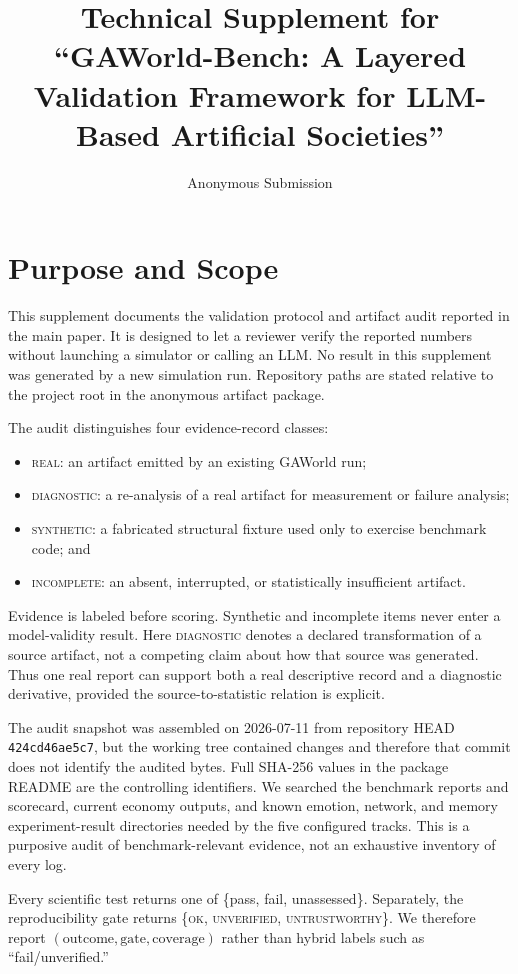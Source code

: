 \documentclass[letterpaper]{article}
\title{Technical Supplement for ``GAWorld-Bench: A Layered Validation Framework for LLM-Based Artificial Societies''}
\author{Anonymous Submission}
\begin{document}
\maketitle

\section{Purpose and Scope}

This supplement documents the validation protocol and artifact audit reported in the main paper. It is
designed to let a reviewer verify the reported numbers without launching a simulator or calling an LLM.
No result in this supplement was generated by a new simulation run. Repository paths are stated relative
to the project root in the anonymous artifact package.

The audit distinguishes four evidence-record classes:
\begin{itemize}
    \item \textsc{real}: an artifact emitted by an existing GAWorld run;
    \item \textsc{diagnostic}: a re-analysis of a real artifact for measurement or failure analysis;
    \item \textsc{synthetic}: a fabricated structural fixture used only to exercise benchmark code; and
    \item \textsc{incomplete}: an absent, interrupted, or statistically insufficient artifact.
\end{itemize}
Evidence is labeled before scoring. Synthetic and incomplete items never enter a model-validity result.
Here \textsc{diagnostic} denotes a declared transformation of a source artifact, not a competing claim
about how that source was generated. Thus one real report can support both a real descriptive record and
a diagnostic derivative, provided the source-to-statistic relation is explicit.

The audit snapshot was assembled on 2026-07-11 from repository HEAD \texttt{424cd46ae5c7}, but the
working tree contained changes and therefore
that commit does not identify the audited bytes. Full SHA-256 values in the package README are the
controlling identifiers. We searched the benchmark reports and scorecard, current economy outputs, and
known emotion, network, and memory experiment-result directories needed by the five configured tracks.
This is a purposive audit of benchmark-relevant evidence, not an exhaustive inventory of every log.

Every scientific test returns one of \{pass, fail, unassessed\}. Separately, the reproducibility gate
returns \{\textsc{ok}, \textsc{unverified}, \textsc{untrustworthy}\}. We therefore report
$(\text{outcome},\text{gate},\text{coverage})$ rather than hybrid labels such as ``fail/unverified.''
\end{document}
